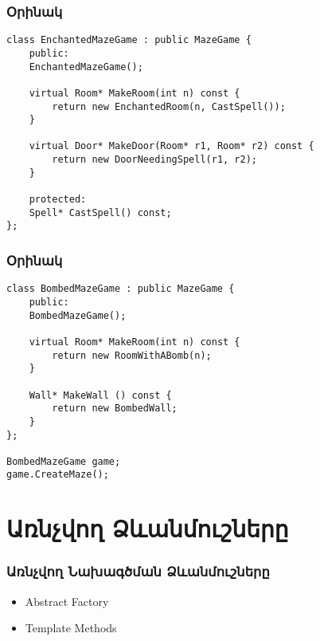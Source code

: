 \documentclass{beamer}
\begin{document}
\begin{frame}[fragile]\frametitle{Օրինակ}
\begin{english}
\begin{verbatim}
class EnchantedMazeGame : public MazeGame {
    public:
    EnchantedMazeGame();

    virtual Room* MakeRoom(int n) const {
        return new EnchantedRoom(n, CastSpell());
    }

    virtual Door* MakeDoor(Room* r1, Room* r2) const {
        return new DoorNeedingSpell(r1, r2);
    }

    protected:
    Spell* CastSpell() const;
};
\end{verbatim}
\end{english}
\end{frame}

\begin{frame}[fragile]\frametitle{Օրինակ}
\begin{english}
\begin{verbatim}
class BombedMazeGame : public MazeGame {
    public:
    BombedMazeGame();

    virtual Room* MakeRoom(int n) const {
        return new RoomWithABomb(n);
    }

    Wall* MakeWall () const {
        return new BombedWall;
    }
};

BombedMazeGame game;
game.CreateMaze();
\end{verbatim}
\end{english}
\end{frame}

\section{Առնչվող Ձևանմուշները}
\begin{frame}\frametitle{Առնչվող Նախագծման Ձևանմուշները}
\vfill
\begin{itemize}
    \item Abstract Factory \vfill
    \item Template Methods
\end{itemize}
\end{frame}
\end{document}
